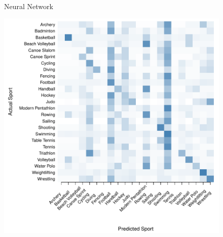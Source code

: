 \begin{figure}
\begin{center}
\begin{minipage}{0.20\textwidth}
\begin{center}
    \end{center}
  \end{minipage}



    Neural Network \\
  \begin{minipage}{0.20\textwidth}
    \begin{center}
      \includegraphics[scale=0.20]{../graphics/sportANN-trn.pdf}
    \end{center}
  \end{minipage}
  \hspace{0.05\textwidth}
  \begin{minipage}{0.20\textwidth}
    \begin{center}

\end{center}
\end{minipage}
\end{center}
\end{figure}
